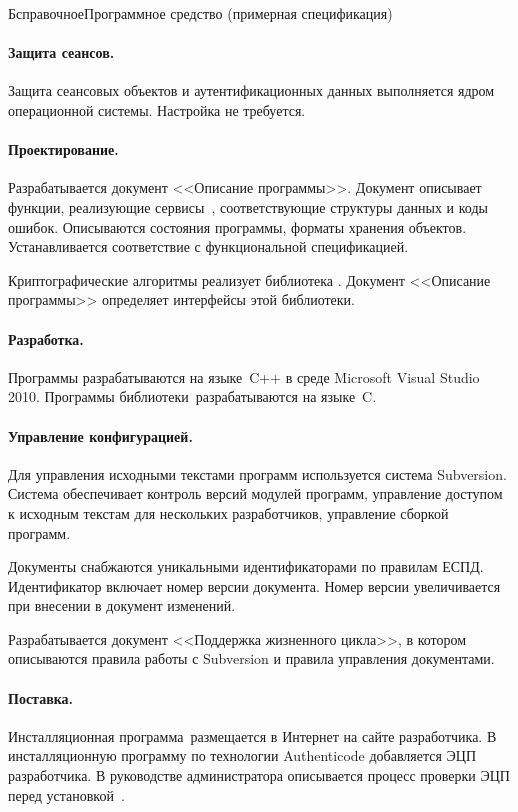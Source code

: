 \begin{appendix}{Б}{справочное}{Программное средство \CryptoDisk 
(примерная спецификация)}
\paragraph*{Защита сеансов.}
Защита сеансовых объектов и аутентификационных данных 
выполняется ядром операционной системы. Настройка не требуется.


\paragraph*{Проектирование.}
Разрабатывается документ <<Описание программы>>.
Документ описывает функции, реализующие сервисы~\TOE,
соответствующие структуры данных и коды ошибок.
Описываются состояния программы, форматы хранения объектов.
Устанавливается соответствие с функциональной спецификацией.

Криптографические алгоритмы реализует библиотека \CryptoKernel.
Документ <<Описание программы>> определяет интерфейсы этой библиотеки.

\paragraph*{Разработка.}
Программы разрабатываются на языке~C++ в среде Microsoft Visual Studio 2010. 
Программы библиотеки~\CryptoKernel разрабатываются на языке~C. 

\paragraph*{Управление конфигурацией.}
Для управления исходными текстами программ используется система Subversion.
Система обеспечивает контроль версий модулей программ, 
управление доступом к исходным текстам для нескольких разработчиков,
управление сборкой программ.

Документы снабжаются уникальными идентификаторами по правилам ЕСПД.
Идентификатор включает номер версии документа. 
Номер версии увеличивается при внесении в документ изменений.

Разрабатывается документ <<Поддержка жизненного цикла>>,
в котором описываются правила работы с Subversion 
и правила управления документами.

\paragraph*{Поставка.}
Инсталляционная программа~\CryptoDisk размещается в Интернет 
на сайте разработчика. В инсталляционную программу
по технологии Authenticode добавляется ЭЦП разработчика.
В руководстве администратора описывается 
процесс проверки ЭЦП перед установкой~\CryptoDisk.


\end{appendix}
